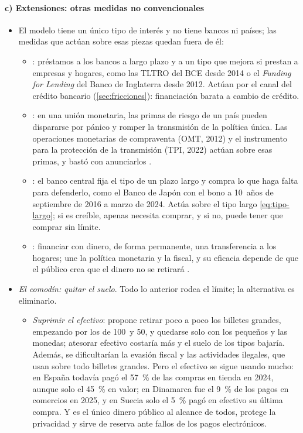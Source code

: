 \documentclass[11pt]{article}
\begin{document}
\paragraph{c) Extensiones: otras medidas no convencionales}\label{sec:extensiones-nc}
\begin{itemize}
\item El modelo tiene un único tipo de interés y no tiene bancos ni países; las medidas que actúan sobre esas piezas quedan fuera de él:
  \begin{itemize}
  \item {}: préstamos a los bancos a largo plazo y a un tipo que mejora si prestan a empresas y hogares, como las TLTRO del BCE desde 2014\nocite{BCE2014TLTRO} o el \emph{Funding for Lending} del Banco de Inglaterra desde 2012. Actúan por el canal del crédito bancario (\ref{sec:fricciones}): financiación barata a cambio de crédito.
  \item {}: en una unión monetaria, las primas de riesgo de un país pueden dispararse por pánico y romper la transmisión de la política única. Las operaciones monetarias de compraventa (OMT, 2012) y el instrumento para la protección de la transmisión (TPI, 2022) actúan sobre esas primas, y bastó con anunciarlos\nocite{BCE2012OMT,BCE2022TPI} .
  \item {}: el banco central fija el tipo de un plazo largo y compra lo que haga falta para defenderlo, como el Banco de Japón con el bono a 10~años de septiembre de 2016 a marzo de 2024\nocite{BoJ2016YCC,BoJ2024Marco}. Actúa sobre el tipo largo \eqref{eq:tipo-largo}; si es creíble, apenas necesita comprar, y si no, puede tener que comprar sin límite.
  \item {}: financiar con dinero, de forma permanente, una transferencia a los hogares; une la política monetaria y la fiscal, y su eficacia depende de que el público crea que el dinero no se retirará\nocite{Gali2020Helicopter} .
  \end{itemize}
\item \emph{El comodín: quitar el suelo}. Todo lo anterior rodea el límite; la alternativa es eliminarlo.
  \begin{itemize}
  \item \emph{Suprimir el efectivo}: \textcite{Rogoff2016Curse} propone retirar poco a poco los billetes grandes, empezando por los de 100~y 50, y quedarse solo con los pequeños y las monedas; atesorar efectivo costaría más y el suelo de los tipos bajaría\nocite{FernandezVillaverde2016Maldicion}. Además, se dificultarían la evasión fiscal y las actividades ilegales, que usan sobre todo billetes grandes. Pero el efectivo se sigue usando mucho: en España todavía pagó el 57~\% de las compras en tienda en 2024, aunque solo el 45~\% en valor\nocite{BCE2024SPACE}; en Dinamarca fue el 9~\% de los pagos en comercios en 2025\nocite{DNB2026Kontanter}, y en Suecia solo el 5~\% pagó en efectivo su última compra\nocite{Riksbank2026Payments}. Y es el único dinero público al alcance de todos, protege la privacidad y sirve de reserva ante fallos de los pagos electrónicos.

\end{itemize}
\end{itemize}
\end{document}
